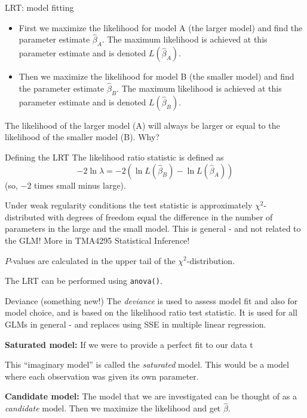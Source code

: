 \documentclass[
  ignorenonframetext,
]{beamer}
\providecommand{\tightlist}{%
  \setlength{\itemsep}{0pt}\setlength{\parskip}{0pt}}
\begin{document}
\begin{frame}{LRT: model fitting}
\label{lrt-model-fitting}
\begin{itemize}
\tightlist
\item
  First we maximize the likelihood for model A (the larger model) and
  find the parameter estimate \(\hat{\beta}_A\). The maximum likelihood
  is achieved at this parameter estimate and is denoted
  \(L(\hat{\beta}_A)\).
\item
  Then we maximize the likelihood for model B (the smaller model) and
  find the parameter estimate \(\hat{\beta}_B\). The maximum likelihood
  is achieved at this parameter estimate and is denoted
  \(L(\hat{\beta}_B)\).
\end{itemize}

The likelihood of the larger model (A) will always be larger or equal to
the likelihood of the smaller model (B). Why?
\end{frame}

\begin{frame}[fragile]{Defining the LRT}
\label{defining-the-lrt}
The likelihood ratio statistic is defined as
\[- 2\ln \lambda=-2(\ln L(\hat{\beta}_B)-\ln L(\hat{\beta}_A)) \] (so,
\(-2\) times small minus large).

Under weak regularity conditions the test statistic is approximately
\(\chi^2\)-distributed with degrees of freedom equal the difference in
the number of parameters in the large and the small model. This is
general - and not related to the GLM! More in TMA4295 Statistical
Inference!

\(P\)-values are calculated in the upper tail of the
\(\chi^2\)-distribution.

The LRT can be performed using \texttt{anova()}.
\end{frame}

\begin{frame}{Deviance (something new!)}
\label{deviance-something-new}
The \emph{deviance} is used to assess model fit and also for model
choice, and is based on the likelihood ratio test statistic. It is used
for all GLMs in general - and replaces using SSE in multiple linear
regression.

\textbf{Saturated model:} If we were to provide a perfect fit to our
data t

This ``imaginary model'' is called the \emph{saturated} model. This
would be a model where each observation was given its own parameter.

\textbf{Candidate model:} The model that we are investigated can be
thought of as a \emph{candidate} model. Then we maximize the likelihood
and get \(\hat{\beta}\).
\end{frame}
\end{document}
